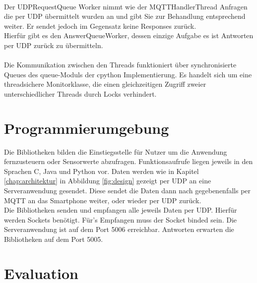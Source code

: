 \documentclass[11pt,a4paper]{report}
\begin{document}
\\
Der UDPRequestQueue Worker nimmt wie der MQTTHandlerThread Anfragen die per UDP übermittelt wurden an und gibt Sie zur Behandlung entsprechend weiter.
Er sendet jedoch im Gegensatz keine Responses zurück.
\\
Hierfür gibt es den AnswerQueueWorker, dessen einzige Aufgabe es ist Antworten per UDP zurück zu übermitteln.
\\\\
Die Kommunikation zwischen den Threads funktioniert über synchronisierte Queues des queue-Moduls\cite{python_queue} der cpython Implementierung.
Es handelt sich um eine threadsichere Monitorklasse, die einen gleichzeitigen Zugriff zweier unterschiedlicher Threads durch Locks verhindert.

\chapter{Programmierumgebung}\label{chap:libs}
Die Bibliotheken bilden die Einstiegsstelle für Nutzer um die Anwendung fernzusteuern oder Sensorwerte abzufragen.
Funktionsaufrufe liegen jeweils in den Sprachen C, Java und Python vor.
Daten werden wie in Kapitel \ref{chap:architektur} in Abbildung \ref{fig:design} gezeigt per UDP an eine Serveranwendung gesendet.
Diese sendet die Daten dann nach gegebenenfalls per MQTT an das Smartphone weiter, oder wieder per UDP zurück.
\\
Die Bibliotheken senden und empfangen alle jeweils Daten per UDP.
Hierfür werden Sockets benötigt.
Für's Empfangen muss der Socket binded sein.
Die Serveranwendung ist auf dem Port 5006 erreichbar.
Antworten erwarten die Bibliotheken auf dem Port 5005.
\chapter{Evaluation}\label{chap:eval}
\end{document}
